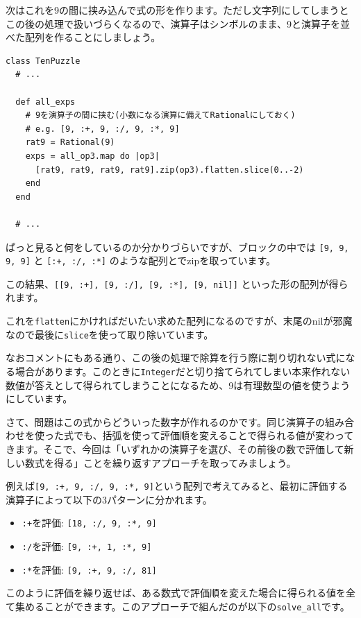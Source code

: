 \documentclass[index]{subfiles}
\begin{document}
次はこれを9の間に挟み込んで式の形を作ります。ただし文字列にしてしまうとこの後の処理で扱いづらくなるので、演算子はシンボルのまま、9と演算子を並べた配列を作ることにしましょう。

\begin{lstlisting}
class TenPuzzle
  # ...

  def all_exps
    # 9を演算子の間に挟む(小数になる演算に備えてRationalにしておく)
    # e.g. [9, :+, 9, :/, 9, :*, 9]
    rat9 = Rational(9)
    exps = all_op3.map do |op3|
      [rat9, rat9, rat9, rat9].zip(op3).flatten.slice(0..-2)
    end   
  end

  # ...
\end{lstlisting}

ぱっと見ると何をしているのか分かりづらいですが、ブロックの中では \verb+[9, 9, 9, 9]+ と \verb|[:+, :/, :*]| のような配列とでzipを取っています。

この結果、\verb|[[9, :+], [9, :/], [9, :*], [9, nil]]| といった形の配列が得られます。

これを\verb+flatten+にかければだいたい求めた配列になるのですが、末尾のnilが邪魔なので最後に\verb+slice+を使って取り除いています。

なおコメントにもある通り、この後の処理で除算を行う際に割り切れない式になる場合があります。このときに\verb+Integer+だと切り捨てられてしまい本来作れない数値が答えとして得られてしまうことになるため、9は有理数型の値を使うようにしています。

さて、問題はこの式からどういった数字が作れるのかです。同じ演算子の組み合わせを使った式でも、括弧を使って評価順を変えることで得られる値が変わってきます。そこで、今回は「いずれかの演算子を選び、その前後の数で評価して新しい数式を得る」ことを繰り返すアプローチを取ってみましょう。

例えば\verb|[9, :+, 9, :/, 9, :*, 9]|という配列で考えてみると、最初に評価する演算子によって以下の3パターンに分かれます。

\begin{itemize}
\item \verb|:+|を評価: \verb|[18, :/, 9, :*, 9]|
\item \verb|:/|を評価: \verb|[9, :+, 1, :*, 9]|
\item \verb|:*|を評価: \verb|[9, :+, 9, :/, 81]|
\end{itemize}

このように評価を繰り返せば、ある数式で評価順を変えた場合に得られる値を全て集めることができます。このアプローチで組んだのが以下の\verb+solve_all+です。
\end{document}
